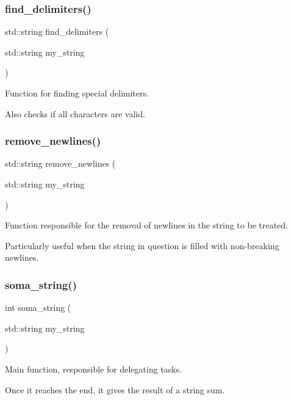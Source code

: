 \subsubsection{find\+\_\+delimiters()}
{\footnotesize\ttfamily std\+::string find\+\_\+delimiters (\begin{DoxyParamCaption}\item[{std\+::string}]{my\+\_\+string }\end{DoxyParamCaption})}



Function for finding special delimiters. 

Also checks if all characters are valid. \mbox{\label{string__soma_8cpp_a9439a2c945461bfec94d80ab46a9c3ae}} 
\subsubsection{remove\+\_\+newlines()}
{\footnotesize\ttfamily std\+::string remove\+\_\+newlines (\begin{DoxyParamCaption}\item[{std\+::string}]{my\+\_\+string }\end{DoxyParamCaption})}



Function responsible for the removal of newlines in the string to be treated. 

Particularly useful when the string in question is filled with non-\/breaking newlines. \mbox{\label{string__soma_8cpp_a781699877e3eb1ffda778737f2467621}} 
\subsubsection{soma\+\_\+string()}
{\footnotesize\ttfamily int soma\+\_\+string (\begin{DoxyParamCaption}\item[{std\+::string}]{my\+\_\+string }\end{DoxyParamCaption})}



Main function, responsible for delegating tasks. 

Once it reaches the end, it gives the result of a string sum. \mbox{\label{string__soma_8cpp_a77eac4da5d157df321a5fd6d239721c2}} 
